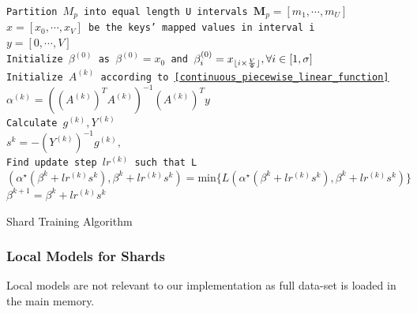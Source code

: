 \begin{algorithm}[H]
    \SetAlgoLined
    \texttt{Partition $M_{p}$ into equal length U intervals $\boldsymbol{M}_p=[m_1,\cdots, m_U]$ }
    {   
        \texttt{$x =[x_0,\cdots, x_V] $ be the keys' mapped values
        in interval i} \\
        \texttt{$y =[0,\cdots, V]$ } \\
        \texttt{Initialize $\beta^{(0)}$ as $\beta^{(0)}=x_0$ and $\beta_i^{(0)}=x_{\lfloor i\times \frac{V}{\Psi}\rfloor}, \forall i\in[1,\sigma]$} \\
        {
            \texttt{Initialize $A^{(k)}$ according to \eqref{continuous_piecewise_linear_function}} \\
            \texttt{$\alpha^{(k)}= ((A^{(k)})^T A^{(k)})^{-1}(A^{(k)})^Ty$} \\
            
            \texttt{Calculate $g^{(k)}, Y^{(k)}$ } \\
            \texttt{$s^{k} = -(Y^{(k)})^{-1} g^{(k)}, $ } \\
            
            \texttt{Find update step $lr^{(k)}$ such that    L$(\alpha^\star(\beta^{k}+ lr^{(k)}s^{k}), \beta^{k}+ lr^{(k)}s^{k}) =\text{min}\{L(\alpha^\star(\beta^{k}+ lr^{(k)}s^{k}), \beta^{k}+ lr^{(k)}s^{k})\} $} \\
            
            \texttt{$\beta^{k+1} = \beta^{k}+ lr^{(k)}s^{k}$ } \\
        }
    }
    
    \caption{Shard Training Algorithm}
    \label{Shard_Training_Lisa}
\end{algorithm}

\subsubsection{Local Models for Shards}
Local models are not relevant to our implementation as full data-set is loaded in the main memory.  
